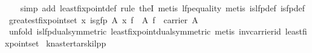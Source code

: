 \begin{isabellebody}
%
\isadelimproof
\ \ %
\endisadelimproof
%
\isatagproof
{}\isamarkupfalse%
\ {}simp\ add{}\ least{}fixpoint{}def{}\ rule\ the{}I{}{}\ metis\ lfp{}equality{}\ metis\ is{}lfp{}def\ is{}fp{}def{}%
\endisatagproof
{\isafoldproof}%
%
\isadelimproof
\isanewline
%
\endisadelimproof
\isanewline
{}\isamarkupfalse%
\ greatest{}fixpoint{}set{}\ {}{}{}x{}\ is{}gfp\ A\ x\ f{}\ {}\ {}\isactrlbsub A\isactrlesub \ f\ {}\ carrier\ A{}\isanewline
%
\isadelimproof
\ \ %
\endisadelimproof
%
\isatagproof
{}\isamarkupfalse%
\ {}unfold\ is{}lfp{}dual{}symmetric{}\ least{}fixpoint{}dual{}symmetric{}{}\ metis\ inv{}carrier{}id\ least{}fixpoint{}set{}%
\endisatagproof
{\isafoldproof}%
%
\isadelimproof
%
\endisadelimproof
%
\isamarkuptrue%
%
\isamarkuptrue%
\isamarkupfalse%
\ knaster{}tarski{}lpp{}\isanewline

\end{isabellebody}

